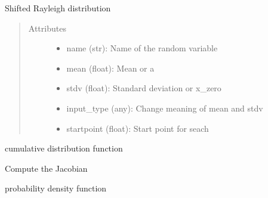 \documentclass[letterpaper,10pt,english]{sphinxmanual}
\begin{document}
\begin{fulllineitems}
Shifted Rayleigh distribution
\begin{quote}\begin{description}
\item[{Attributes }] \leavevmode\begin{itemize}
\item {} 
name (str):   Name of the random variable

\item {} 
mean (float): Mean or a

\item {} 
stdv (float): Standard deviation or x\_zero

\item {} 
input\_type (any): Change meaning of mean and stdv

\item {} 
startpoint (float): Start point for seach

\end{itemize}

\end{description}\end{quote}


\begin{fulllineitems}
cumulative distribution function

\end{fulllineitems}



\begin{fulllineitems}
Compute the Jacobian

\end{fulllineitems}



\begin{fulllineitems}
probability density function

\end{fulllineitems}




\end{fulllineitems}
\end{document}
